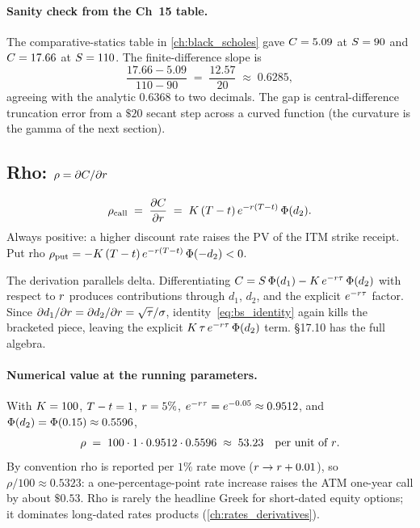 \paragraph{Sanity check from the Ch~15 table.}
The comparative-statics table in \cref{ch:black_scholes} gave
$C = 5.09$ at $S = 90$ and $C = 17.66$ at $S = 110$.
The finite-difference slope is
\begin{equation*}
  \frac{17.66 - 5.09}{110 - 90} \;=\; \frac{12.57}{20} \;\approx\; 0.6285,
\end{equation*}
agreeing with the analytic $0.6368$ to two decimals. The gap is
central-difference truncation error from a $\$20$ secant step
across a curved function (the curvature is the gamma of the next
section).

\subsection{Rho: $\rho = \partial C / \partial r$}
\label{subsec:ch16_rho}

\begin{keyfactbox}
\begin{equation*}
  \rho_{\text{call}} \;=\; \frac{\partial C}{\partial r}
   \;=\; K\,(T - t)\,e^{-r(T - t)}\,\Phi(d_2).
\end{equation*}
Always positive: a higher discount rate raises the PV of the ITM
strike receipt. Put rho $\rho_{\text{put}} = -K\,(T -
t)\,e^{-r(T-t)}\,\Phi(-d_2) < 0$.
\end{keyfactbox}

The derivation parallels delta. Differentiating
$C = S\,\Phi(d_1) - K\,e^{-r \tau}\,\Phi(d_2)$
with respect to $r$ produces contributions through $d_1$, $d_2$,
and the explicit $e^{-r \tau}$ factor. Since $\partial d_1 /
\partial r = \partial d_2 / \partial r = \sqrt{\tau}/\sigma$,
identity~\eqref{eq:bs_identity} again kills the bracketed piece,
leaving the explicit $K\,\tau\,e^{-r \tau}\,\Phi(d_2)$
term. \citeHull \S17.10 has the full algebra.

\paragraph{Numerical value at the running parameters.} With
$K = 100$, $T - t = 1$, $r = 5\%$,
$e^{-r \tau} = e^{-0.05} \approx 0.9512$, and
$\Phi(d_2) = \Phi(0.15) \approx 0.5596$,
\begin{equation*}
  \rho \;=\; 100 \cdot 1 \cdot 0.9512 \cdot 0.5596 \;\approx\; 53.23
  \quad \text{per unit of $r$}.
\end{equation*}
By convention rho is reported per $1\%$ rate move ($r \to r
+ 0.01$), so $\rho/100 \approx 0.5323$: a one-percentage-point rate
increase raises the ATM one-year call by about $\$0.53$. Rho is
rarely the headline Greek for short-dated equity options; it
dominates long-dated rates products
(\cref{ch:rates_derivatives}).

